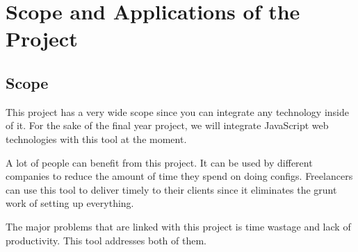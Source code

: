 \section{Scope and Applications of the Project}

\subsection{Scope}
This project has a very wide scope since you can integrate any technology inside of it. For the sake of the final year project, we will integrate JavaScript web technologies with this tool at the moment.

A lot of people can benefit from this project. It can be used by different companies to reduce the amount of time they spend on doing configs. Freelancers can use this tool to deliver timely to their clients since it eliminates the grunt work of setting up everything.

The major problems that are linked with this project is time wastage and lack of productivity. This tool addresses both of them.


